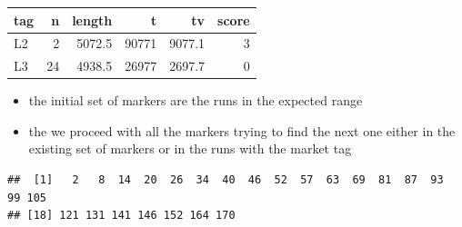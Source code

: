 \documentclass[]{article}
\newenvironment{Shaded}{\begin{snugshade}}{\end{snugshade}}
\newcommand{\KeywordTok}[1]{\textcolor[rgb]{0.13,0.29,0.53}{\textbf{{#1}}}}
\newcommand{\StringTok}[1]{\textcolor[rgb]{0.31,0.60,0.02}{{#1}}}
\newcommand{\NormalTok}[1]{{#1}}
\begin{document}
\begin{longtable}[c]{@{}lrrrrr@{}}
\toprule
tag & n & length & t & tv & score\tabularnewline
\midrule
\endhead
L2 & 2 & 5072.5 & 90771 & 9077.1 & 3\tabularnewline
L3 & 24 & 4938.5 & 26977 & 2697.7 & 0\tabularnewline
\bottomrule
\end{longtable}

\begin{itemize}
\item
  the initial set of markers are the runs in the expected range
\item
  the we proceed with all the markers trying to find the next one either
  in the existing set of markers or in the runs with the market tag
\end{itemize}

\begin{Shaded}
\end{Shaded}

\begin{verbatim}
##  [1]   2   8  14  20  26  34  40  46  52  57  63  69  81  87  93  99 105
## [18] 121 131 141 146 152 164 170
\end{verbatim}
\end{document}
